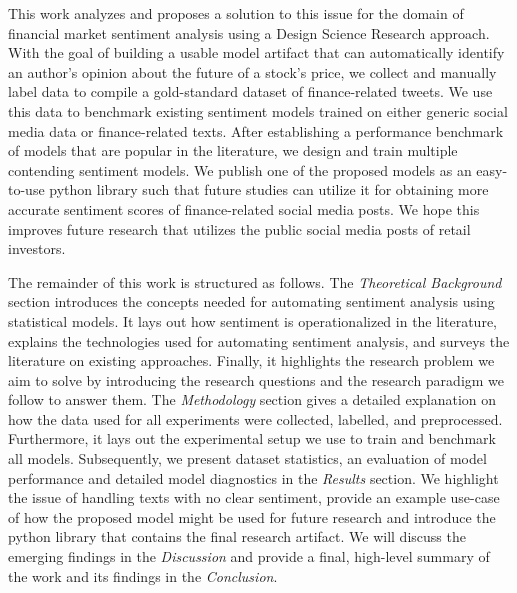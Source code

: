 This work analyzes and proposes a solution to this issue for the domain of financial market sentiment analysis using a Design Science Research approach. With the goal of building a usable model artifact that can automatically identify an author's opinion about the future of a stock's price, we collect and manually label data to compile a gold-standard dataset of finance-related tweets. We use this data to benchmark existing sentiment models trained on either generic social media data or finance-related texts. After establishing a performance benchmark of models that are popular in the literature, we design and train multiple contending sentiment models. We publish one of the proposed models as an easy-to-use python library such that future studies can utilize it for obtaining more accurate sentiment scores of finance-related social media posts. We hope this improves future research that utilizes the public social media posts of retail investors.

The remainder of this work is structured as follows. The \emph{Theoretical Background} section introduces the concepts needed for automating sentiment analysis using statistical models. It lays out how sentiment is operationalized in the literature, explains the technologies used for automating sentiment analysis, and surveys the literature on existing approaches. Finally, it highlights the research problem we aim to solve by introducing the research questions and the research paradigm we follow to answer them. The \emph{Methodology} section gives a detailed explanation on how the data used for all experiments were collected, labelled, and preprocessed. Furthermore, it lays out the experimental setup we use to train and benchmark all models. Subsequently, we present dataset statistics, an evaluation of model performance and detailed model diagnostics in the \emph{Results} section. We highlight the issue of handling texts with no clear sentiment, provide an example use-case of how the proposed model might be used for future research and introduce the python library that contains the final research artifact. We will discuss the emerging findings in the \emph{Discussion} and provide a final, high-level summary of the work and its findings in the \emph{Conclusion}.
